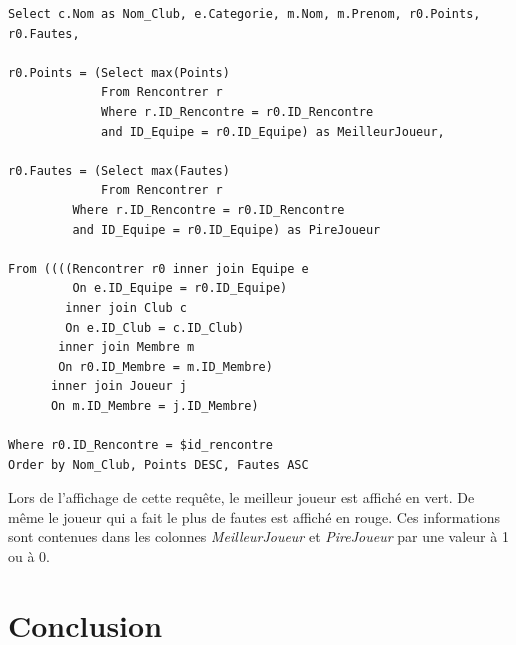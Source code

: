 \documentclass[a4paper»,8pt,french,fleqn]{report}
\begin{document}
\begin{lstlisting}
Select c.Nom as Nom_Club, e.Categorie, m.Nom, m.Prenom, r0.Points, r0.Fautes, 

r0.Points = (Select max(Points) 
             From Rencontrer r
             Where r.ID_Rencontre = r0.ID_Rencontre
             and ID_Equipe = r0.ID_Equipe) as MeilleurJoueur,

r0.Fautes = (Select max(Fautes) 
             From Rencontrer r
	     Where r.ID_Rencontre = r0.ID_Rencontre
	     and ID_Equipe = r0.ID_Equipe) as PireJoueur 
								
From ((((Rencontrer r0 inner join Equipe e
         On e.ID_Equipe = r0.ID_Equipe) 
        inner join Club c            
        On e.ID_Club = c.ID_Club) 
       inner join Membre m
       On r0.ID_Membre = m.ID_Membre) 
      inner join Joueur j
      On m.ID_Membre = j.ID_Membre)

Where r0.ID_Rencontre = $id_rencontre
Order by Nom_Club, Points DESC, Fautes ASC
\end{lstlisting}

Lors de l'affichage de cette requête, le meilleur joueur est affiché en vert. De même le joueur qui a fait le plus de fautes est affiché en rouge. Ces informations sont contenues dans les colonnes \textit{MeilleurJoueur} et \textit{PireJoueur} par une valeur à 1 ou à 0.

\chapter*{Conclusion}
\end{document}
